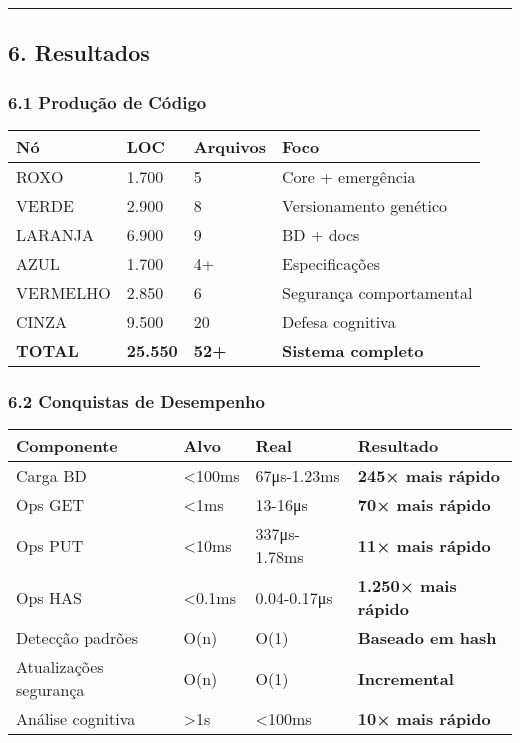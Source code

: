 \documentclass[
]{article}
\begin{document}
\begin{center}\rule{0.5\linewidth}{0.5pt}\end{center}

\subsection{6. Resultados}\label{resultados}

\subsubsection{6.1 Produção de
Código}\label{produuxe7uxe3o-de-cuxf3digo}

{\def\LTcaptype{} %
\begin{longtable}[]{@{}llll@{}}
\toprule\noalign{}
Nó & LOC & Arquivos & Foco \\
\midrule\noalign{}
\endhead
\bottomrule\noalign{}
\endlastfoot
ROXO & 1.700 & 5 & Core + emergência \\
VERDE & 2.900 & 8 & Versionamento genético \\
LARANJA & 6.900 & 9 & BD + docs \\
AZUL & 1.700 & 4+ & Especificações \\
VERMELHO & 2.850 & 6 & Segurança comportamental \\
CINZA & 9.500 & 20 & Defesa cognitiva \\
\textbf{TOTAL} & \textbf{25.550} & \textbf{52+} & \textbf{Sistema
completo} \\
\end{longtable}
}

\subsubsection{6.2 Conquistas de
Desempenho}\label{conquistas-de-desempenho}

{\def\LTcaptype{} %
\begin{longtable}[]{@{}llll@{}}
\toprule\noalign{}
Componente & Alvo & Real & Resultado \\
\midrule\noalign{}
\endhead
\bottomrule\noalign{}
\endlastfoot
Carga BD & \textless100ms & 67μs-1.23ms & \textbf{245× mais rápido} \\
Ops GET & \textless1ms & 13-16μs & \textbf{70× mais rápido} \\
Ops PUT & \textless10ms & 337μs-1.78ms & \textbf{11× mais rápido} \\
Ops HAS & \textless0.1ms & 0.04-0.17μs & \textbf{1.250× mais rápido} \\
Detecção padrões & O(n) & O(1) & \textbf{Baseado em hash} \\
Atualizações segurança & O(n) & O(1) & \textbf{Incremental} \\
Análise cognitiva & \textgreater1s & \textless100ms & \textbf{10× mais
rápido} \\
\end{longtable}
}
\end{document}
